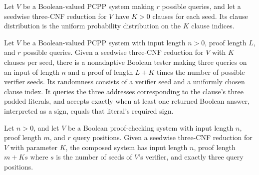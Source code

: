 \begin{definition}
\label{FABL.SeedwiseThreeCNFReduction.clauseDistribution}
\leanok
{}
Let $V$ be a Boolean-valued PCPP system making $r$ possible queries, and let a seedwise
three-CNF reduction for $V$ have $K>0$ clauses for each seed. Its clause distribution is
the uniform probability distribution on the $K$ clause indices.
\end{definition}

\begin{definition}
\label{FABL.composeThreeQueryVerifier}
\leanok
{}
Let $V$ be a Boolean-valued PCPP system with input length $n>0$, proof length $L$, and
$r$ possible queries. Given a seedwise three-CNF reduction for $V$ with $K$ clauses per
seed, there is a nonadaptive Boolean tester making three queries on an input of length
$n$ and a proof of length $L+K$ times the number of possible verifier seeds. Its
randomness consists of a verifier seed and a uniformly chosen clause index. It queries
the three addresses corresponding to the clause's three padded literals, and accepts
exactly when at least one returned Boolean answer, interpreted as a sign, equals that
literal's required sign.
\end{definition}

\begin{definition}
\label{FABL.composeThreeQuerySystem}
\leanok
{}
Let $n>0$, and let $V$ be a Boolean proof-checking system with input length $n$, proof
length $m$, and $r$ query positions. Given a seedwise three-CNF reduction for $V$ with
parameter $K$, the composed system has input length $n$, proof length $m+K s$ where $s$
is the number of seeds of $V$'s verifier, and exactly three query positions.
\end{definition}

